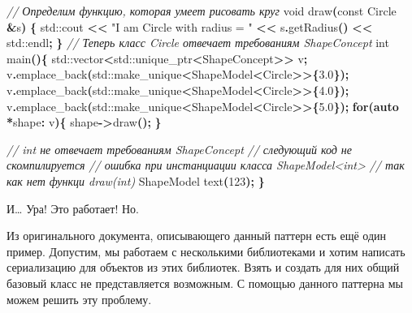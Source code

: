 \documentclass[14pt,a4paper]{article}
\newenvironment{Shaded}{\begin{paragraph}}{\end{paragraph}}
\newenvironment{Highlighting}{\begin{paragraph}}{\end{paragraph}}
\newcommand{\KeywordTok}[1]{\textcolor[rgb]{0.13,0.29,0.53}{\textbf{#1}}}
\newcommand{\DataTypeTok}[1]{\textcolor[rgb]{0.13,0.29,0.53}{#1}}
\newcommand{\DecValTok}[1]{\textcolor[rgb]{0.00,0.00,0.81}{#1}}
\newcommand{\FloatTok}[1]{\textcolor[rgb]{0.00,0.00,0.81}{#1}}
\newcommand{\StringTok}[1]{\textcolor[rgb]{0.31,0.60,0.02}{#1}}
\newcommand{\CommentTok}[1]{\textcolor[rgb]{0.56,0.35,0.01}{\textit{#1}}}
\newcommand{\ControlFlowTok}[1]{\textcolor[rgb]{0.13,0.29,0.53}{\textbf{#1}}}
\newcommand{\OperatorTok}[1]{\textcolor[rgb]{0.81,0.36,0.00}{\textbf{#1}}}
\newcommand{\BuiltInTok}[1]{#1}
\newcommand{\AttributeTok}[1]{\textcolor[rgb]{0.77,0.63,0.00}{#1}}
\newcommand{\NormalTok}[1]{#1}
\begin{document}
\begin{Shaded}
\begin{Highlighting}[]
\CommentTok{// Определим функцию, которая умеет рисовать круг}
\DataTypeTok{void}\NormalTok{ draw}\OperatorTok{(}\AttributeTok{const}\NormalTok{ Circle }\OperatorTok{\&}\NormalTok{s}\OperatorTok{)} \OperatorTok{\{}
  \BuiltInTok{std::}\NormalTok{cout}\OperatorTok{ \textless{}\textless{}} \StringTok{"I am Circle with radius = "} \OperatorTok{\textless{}\textless{}} 
\NormalTok{        s}\OperatorTok{.}\NormalTok{getRadius}\OperatorTok{()} \OperatorTok{\textless{}\textless{}} \BuiltInTok{std::}\NormalTok{endl}\OperatorTok{;}
\OperatorTok{\}}
\CommentTok{// Теперь класс Circle отвечает требованиям ShapeConcept}
\DataTypeTok{int}\NormalTok{ main}\OperatorTok{()\{}
    \BuiltInTok{std::}\NormalTok{vector}\OperatorTok{\textless{}}\BuiltInTok{std::}\NormalTok{unique\_ptr}\OperatorTok{\textless{}}\NormalTok{ShapeConcept}\OperatorTok{\textgreater{}\textgreater{}}\NormalTok{ v}\OperatorTok{;}
\NormalTok{    v}\OperatorTok{.}\NormalTok{emplace\_back}\OperatorTok{(}\BuiltInTok{std::}\NormalTok{make\_unique}\OperatorTok{\textless{}}\NormalTok{ShapeModel}\OperatorTok{\textless{}}\NormalTok{Circle}\OperatorTok{\textgreater{}\textgreater{}\{}\FloatTok{3.0}\OperatorTok{\});}
\NormalTok{    v}\OperatorTok{.}\NormalTok{emplace\_back}\OperatorTok{(}\BuiltInTok{std::}\NormalTok{make\_unique}\OperatorTok{\textless{}}\NormalTok{ShapeModel}\OperatorTok{\textless{}}\NormalTok{Circle}\OperatorTok{\textgreater{}\textgreater{}\{}\FloatTok{4.0}\OperatorTok{\});}
\NormalTok{    v}\OperatorTok{.}\NormalTok{emplace\_back}\OperatorTok{(}\BuiltInTok{std::}\NormalTok{make\_unique}\OperatorTok{\textless{}}\NormalTok{ShapeModel}\OperatorTok{\textless{}}\NormalTok{Circle}\OperatorTok{\textgreater{}\textgreater{}\{}\FloatTok{5.0}\OperatorTok{\});}
    \ControlFlowTok{for}\OperatorTok{(}\KeywordTok{auto} \OperatorTok{*}\NormalTok{shape}\OperatorTok{:}\NormalTok{ v}\OperatorTok{)\{}
\NormalTok{        shape}\OperatorTok{{-}\textgreater{}}\NormalTok{draw}\OperatorTok{();}
    \OperatorTok{\}}
  
  \CommentTok{// int не отвечает требованиям ShapeConcept}
  \CommentTok{// следующий код не скомпилируется}
  \CommentTok{// ошибка при инстанциации класса ShapeModel\textless{}int\textgreater{}}
  \CommentTok{// так как нет функци draw(int)}
\NormalTok{  ShapeModel text}\OperatorTok{(}\DecValTok{123}\OperatorTok{);} 
\OperatorTok{\}}
\end{Highlighting}
\end{Shaded}

И\ldots{} Ура! Это работает! Но.

Из оригинального документа, описывающего данный паттерн есть ещё один
пример. Допустим, мы работаем с несколькими библиотеками и хотим
написать сериализацию для объектов из этих библиотек. Взять и создать
для них общий базовый класс не представляется возможным. С помощью
данного паттерна мы можем решить эту проблему.
\end{document}
